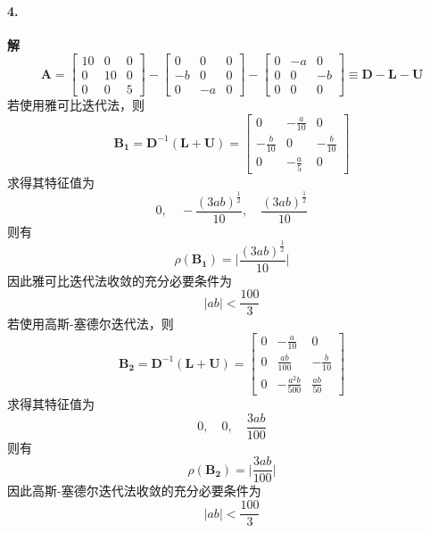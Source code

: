 \paragraph{4.} \textbf{解} \\
\[\mathbf{A} = \begin{bmatrix}
10 & 0 & 0\\
0 & 10 & 0\\ 
0 & 0 & 5
\end{bmatrix} - \begin{bmatrix}
0 & 0 & 0\\
-b & 0 & 0\\ 
0 & -a & 0
\end{bmatrix} - \begin{bmatrix}
0 & -a & 0\\
0 & 0 & -b\\ 
0 & 0 & 0
\end{bmatrix} \equiv \mathbf{D} - \mathbf{L} - \mathbf{U}\]
若使用雅可比迭代法，则
\[\mathbf{B_1} = \mathbf{D}^{-1}(\mathbf{L} + \mathbf{U}) = \begin{bmatrix}
0 & -\frac{a}{10} & 0\\
-\frac{b}{10} & 0 & -\frac{b}{10}\\ 
0 & -\frac{a}{5} & 0
\end{bmatrix}\]
求得其特征值为
\[0, \quad -\frac{(3ab)^{\frac{1}{2}}}{10}, \quad \frac{(3ab)^{\frac{1}{2}}}{10}\]
则有
\[\rho(\mathbf{B_1}) = \bigg|\frac{(3ab)^{\frac{1}{2}}}{10}\bigg|\]
因此雅可比迭代法收敛的充分必要条件为
\[|ab| < \frac{100}{3}\]
若使用高斯-塞德尔迭代法，则
\[\mathbf{B_2} = \mathbf{D}^{-1}(\mathbf{L} + \mathbf{U}) = \begin{bmatrix}
0 & -\frac{a}{10} & 0\\
0 & \frac{ab}{100} & -\frac{b}{10}\\ 
0 & -\frac{a^2b}{500} & \frac{ab}{50}
\end{bmatrix}\]
求得其特征值为
\[0, \quad 0, \quad \frac{3ab}{100}\]
则有
\[\rho(\mathbf{B_2}) = \bigg|\frac{3ab}{100}\bigg|\]
因此高斯-塞德尔迭代法收敛的充分必要条件为
\[|ab| < \frac{100}{3}\]
\newline

